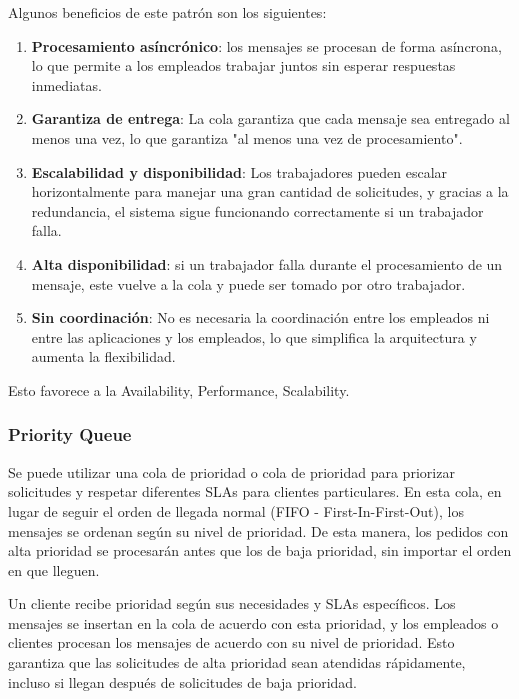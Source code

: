 \documentclass{article}
\begin{document}
		Algunos beneficios de este patrón son los siguientes:
		\begin{enumerate}
			\item \textbf{Procesamiento asíncrónico}: los mensajes se procesan de forma asíncrona, lo que permite a los empleados trabajar juntos sin esperar respuestas inmediatas.
			
			\item \textbf{Garantiza de entrega}: La cola garantiza que cada mensaje sea entregado al menos una vez, lo que garantiza "al menos una vez de procesamiento".
			\item \textbf{Escalabilidad y disponibilidad}: Los trabajadores pueden escalar horizontalmente para manejar una gran cantidad de solicitudes, y gracias a la redundancia, el sistema sigue funcionando correctamente si un trabajador falla.
			\item \textbf{Alta disponibilidad}: si un trabajador falla durante el procesamiento de un mensaje, este vuelve a la cola y puede ser tomado por otro trabajador.
			\item \textbf{Sin coordinación}: No es necesaria la coordinación entre los empleados ni entre las aplicaciones y los empleados, lo que simplifica la arquitectura y aumenta la flexibilidad.		
				
		\end{enumerate}
		
		
		Esto favorece a la Availability, Performance, Scalability.
		
		\subsubsection{Priority Queue}
		Se puede utilizar una cola de prioridad o cola de prioridad para priorizar solicitudes y respetar diferentes SLAs para clientes particulares. En esta cola, en lugar de seguir el orden de llegada normal (FIFO - First-In-First-Out), los mensajes se ordenan según su nivel de prioridad. De esta manera, los pedidos con alta prioridad se procesarán antes que los de baja prioridad, sin importar el orden en que lleguen.
		
		Un cliente recibe prioridad según sus necesidades y SLAs específicos. Los mensajes se insertan en la cola de acuerdo con esta prioridad, y los empleados o clientes procesan los mensajes de acuerdo con su nivel de prioridad. Esto garantiza que las solicitudes de alta prioridad sean atendidas rápidamente, incluso si llegan después de solicitudes de baja prioridad.
		
\end{document}
